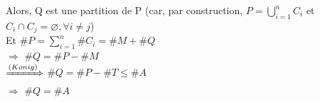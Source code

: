 Alors, Q est une partition de P (car, par construction, $P= \bigcup_{i=1}^{n} C_{i}$ et $C_{i} \cap C_{j} = \varnothing, \forall i \neq j $)\\

Et $\#P = \sum_{i=1}^{n} \#C_{i} = \#M + \#Q$ \\

$\Rightarrow$ $\#Q = \#P - \#M$ \\

$\xRightarrow{(Konig)}$ $\#Q = \#P - \#T \leq \#A$ \\

$\Rightarrow$ $\#Q = \#A $ \\